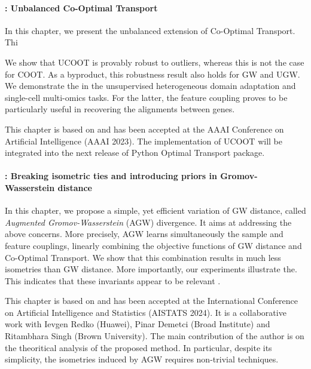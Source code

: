 \paragraph{: Unbalanced Co-Optimal Transport}

In this chapter, we present the unbalanced extension of Co-Optimal Transport.
Thi

We show that UCOOT is provably robust to outliers, whereas this is not the case for COOT.
As a byproduct, this robustness result also holds for GW and UGW.
We demonstrate the in the unsupervised heterogeneous domain adaptation and single-cell multi-omics
tasks. For the latter, the feature coupling proves to be particularly useful in recovering the
alignments between genes.

This chapter is based on \citep{Tran23} and has been accepted at the
AAAI Conference on Artificial Intelligence (AAAI 2023). The implementation of UCOOT will be
integrated into the next release of Python Optimal Transport package.

\paragraph{: Breaking isometric ties and introducing priors in
Gromov-Wasserstein distance}

In this chapter, we propose a simple, yet efficient variation of GW distance, called
\textit{Augmented Gromov-Wasserstein} (AGW) divergence. It aims at addressing the above concerns.
More precisely, AGW learns simultaneously the sample and feature couplings,
 linearly combining the objective functions of GW distance and Co-Optimal Transport.
We show that this combination results in much less isometries than GW distance.
More importantly, our experiments illustrate the. This indicates that these invariants appear to be relevant .

This chapter is based on \citep{Demetci23} and has been accepted at the
International Conference on Artificial Intelligence and Statistics (AISTATS 2024).
It is a collaborative work with Ievgen Redko (Huawei), Pinar Demetci (Broad Institute)
and Ritambhara Singh (Brown University). The main contribution of the author is on the
theoritical analysis of the proposed method. In particular, despite its simplicity,
the isometries induced by AGW requires non-trivial techniques.